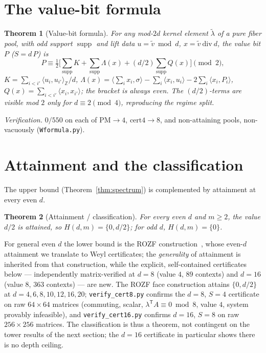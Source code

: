 \documentclass[11pt]{article}
\newtheorem{theorem}{Theorem}
\theoremstyle{remark}
\newcommand{\Z}{\mathbb{Z}}
\newcommand{\ip}[2]{\langle #1,#2\rangle}
\newcommand{\ipz}[2]{\langle #1,#2\rangle_{\Z}}
\DeclareMathOperator{\supp}{supp}
\begin{document}
\section{The value-bit formula}
\begin{theorem}[Value-bit formula]\label{thm:valuebit}
For any mod-$2d$ kernel element $\tilde\lambda$ of a pure fiber pool, with odd support $\supp$ and
lift data $u=\tilde v\bmod d$, $x=\tilde v\ \mathrm{div}\ d$, the value bit $P$ ($S=d\,P$) is
\[
P\equiv \tfrac12\Big[\textstyle\sum_{\supp}K+\sum_{\supp}\Lambda(x)+(d/2)\sum_{\supp}Q(x)\Big]\pmod 2,
\]
$K=\sum_{i<i'}\ipz{u_i}{u_{i'}}/d$, $\Lambda(x)=\ip{\sum_i x_i}{\sigma}-\sum_i\ip{x_i}{u_i}
-2\sum_i\ip{x_i}{P_i}$, $Q(x)=\sum_{i<i'}\ip{x_i}{x_{i'}}$; the bracket is always even. The
$(d/2)$-terms are visible mod $2$ only for $d\equiv 2\pmod 4$, reproducing the regime split.
\end{theorem}
\noindent\emph{Verification.} $0/550$ on each of $\mathrm{PM}\to 4$, $\mathrm{cert4}\to 8$, and
non-attaining pools, non-vacuously (\texttt{Wformula.py}).

\section{Attainment and the classification}
The upper bound (Theorem~\ref{thm:spectrum}) is complemented by attainment at every even $d$.
\begin{theorem}[Attainment / classification]\label{thm:attain}
For every even $d$ and $m\ge 2$, the value $d/2$ is attained, so $H(d,m)=\{0,d/2\}$; for odd $d$,
$H(d,m)=\{0\}$.
\end{theorem}
\noindent For general even $d$ the lower bound is the ROZF construction~\cite{ROZF}, whose even-$d$
attainment we translate to Weyl certificates; the \emph{generality} of attainment is inherited from
that construction, while the explicit, self-contained certificates below --- independently
matrix-verified at $d=8$ (value $4$, $89$ contexts) and $d=16$ (value $8$, $363$ contexts) --- are
new. The ROZF face construction attains $\{0,d/2\}$ at $d=4,6,8,10,12,16,20$; \texttt{verify\_cert8.py}
confirms the $d=8$, $S=4$ certificate on raw $64\times 64$ matrices (commuting, scalar,
$\lambda^{\mathsf T}A\equiv 0\bmod 8$, value $4$, system provably infeasible), and
\texttt{verify\_cert16.py} confirms $d=16$, $S=8$ on raw $256\times 256$ matrices. The classification
is thus a theorem, not contingent on the tower results of the next section; the $d=16$ certificate in
particular shows there is no depth ceiling.
\end{document}
